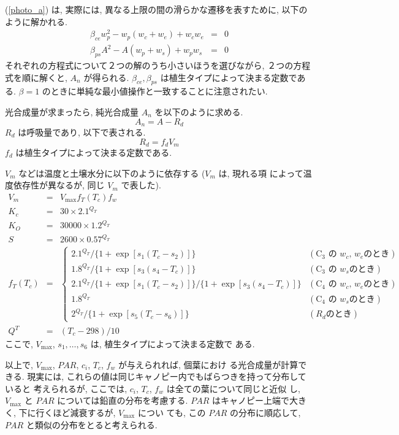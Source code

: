 (\ref{photo_a}) は, 実際には, 異なる上限の間の滑らかな遷移を表すために,
以下のように解かれる.
\begin{eqnarray}
 \beta_{ce} w_p^2 - w_p(w_c + w_e) + w_c w_e &=& 0 \\
 \beta_{ps} A^2 - A(w_p + w_s) + w_p w_s &=& 0
\end{eqnarray}
それぞれの方程式について２つの解のうち小さいほうを選びながら, ２つの方程
式を順に解くと, $A_n$ が得られる.
$\beta_{ce}, \beta_{ps}$ は植生タイプによって決まる定数である. $\beta=1$
のときに単純な最小値操作と一致することに注意されたい.

光合成量が求まったら, 純光合成量 $A_n$ を以下のように求める.
\begin{equation}
 A_n = A - R_d
\end{equation}
$R_d$ は呼吸量であり, 以下で表される.
\begin{equation}
 R_d = f_d V_m
\end{equation}
$f_d$ は植生タイプによって決まる定数である.

$V_m$ などは温度と土壌水分に以下のように依存する ($V_m$ は, 現れる項
によって温度依存性が異なるが, 同じ $V_m$ で表した).
\begin{eqnarray}
 V_m &=& V_{\max} f_T(T_c) f_w \\
 K_c &=& 30 \times 2.1^{Q_T} \\
 K_O &=& 30000 \times 1.2^{Q_T} \\
 S   &=& 2600 \times 0.57^{Q_T} \\
 f_T(T_c) &=& \left\{
\begin{array}{ll}
 2.1^{Q_T}/\{1 + \exp[s_1(T_c-s_2)]\}&  (\mbox{C$_3$ の $w_c$, $w_e$のとき})\\
 1.8^{Q_T}/\{1 + \exp[s_3(s_4-T_c)]\}&  (\mbox{C$_3$ の $w_s$のとき}) \\
 2.1^{Q_T}/\{1 + \exp[s_1(T_c-s_2)]\}/\{1 + \exp[s_3(s_4-T_c)]\}
  &  (\mbox{C$_4$ の $w_c$, $w_e$のとき})\\
 1.8^{Q_T} &  (\mbox{C$_4$ の $w_s$のとき}) \\
 2^{Q_T}/\{1 + \exp[s_5(T_c-s_6)]\} &  (\mbox{$R_d$のとき})
\end{array}
\right. \\
Q^T &=& (T_c - 298) / 10
\end{eqnarray}
ここで, $V_{\max}$, $s_1, \ldots, s_6$ は, 植生タイプによって決まる定数で
ある.

以上で, $V_{\max}$, $PAR$, $c_i$, $T_c$, $f_w$ が与えられれば, 個葉におけ
る光合成量が計算できる.
現実には, これらの値は同じキャノピー内でもばらつきを持って分布していると
考えられるが, ここでは, $c_i$, $T_c$, $f_w$ は全ての葉について同じと近似
し, $V_{\max}$ と $PAR$ については鉛直の分布を考慮する.
$PAR$ はキャノピー上端で大きく, 下に行くほど減衰するが, $V_{\max}$ につい
ても, この $PAR$ の分布に順応して, $PAR$ と類似の分布をとると考えられる.

